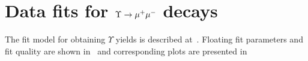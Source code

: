 \chapter{Data fits for \texorpdfstring{$\Upsilon \rightarrow {\ensuremath{\mu^+\mu^-}}$}{Y --> mu+mu-} decays}
\label{sec:upsilon:fits}

The fit model for obtaining $\Upsilon$ yields  is described
at~. Floating fit parameters and fit quality are shown
in~ and corresponding plots are presented
in~



